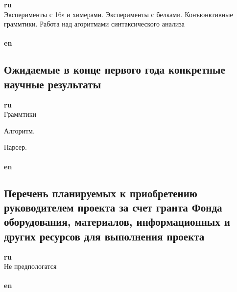 \documentclass[12pt]{article}  %
\theoremstyle{remark}
\begin{document}
\textbf{ru}\\
Эксперименты с 16s и химерами. Эксперименты с белками. Конъюнктивные граммтики. Работа над агоритмами синтаксического анализа
\\
\\
\textbf{en}\\

\subsection{Ожидаемые в конце первого года конкретные научные результаты}

\textbf{ru}\\
Граммтики

Алгоритм.

Парсер.
\\
\\
\textbf{en}\\

\subsection{Перечень планируемых к приобретению руководителем проекта за счет гранта Фонда оборудования, материалов, информационных и других ресурсов для выполнения проекта}

\textbf{ru}\\
Не предпологатся
\\
\\
\textbf{en}\\
\end{document}
